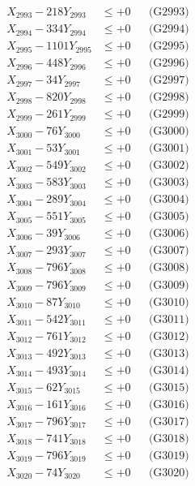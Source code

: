 \documentclass[a4paper,10pt]{article}
\begin{document}
{\begin{align}
X_{2993} - 218Y_{2993} &\leq +0 && \text{(G2993)} \\
X_{2994} - 334Y_{2994} &\leq +0 && \text{(G2994)} \\
X_{2995} - 1101Y_{2995} &\leq +0 && \text{(G2995)} \\
X_{2996} - 448Y_{2996} &\leq +0 && \text{(G2996)} \\
X_{2997} - 34Y_{2997} &\leq +0 && \text{(G2997)} \\
X_{2998} - 820Y_{2998} &\leq +0 && \text{(G2998)} \\
X_{2999} - 261Y_{2999} &\leq +0 && \text{(G2999)} \\
X_{3000} - 76Y_{3000} &\leq +0 && \text{(G3000)} \\
\allowbreak
X_{3001} - 53Y_{3001} &\leq +0 && \text{(G3001)} \\
X_{3002} - 549Y_{3002} &\leq +0 && \text{(G3002)} \\
X_{3003} - 583Y_{3003} &\leq +0 && \text{(G3003)} \\
X_{3004} - 289Y_{3004} &\leq +0 && \text{(G3004)} \\
X_{3005} - 551Y_{3005} &\leq +0 && \text{(G3005)} \\
X_{3006} - 39Y_{3006} &\leq +0 && \text{(G3006)} \\
X_{3007} - 293Y_{3007} &\leq +0 && \text{(G3007)} \\
X_{3008} - 796Y_{3008} &\leq +0 && \text{(G3008)} \\
X_{3009} - 796Y_{3009} &\leq +0 && \text{(G3009)} \\
X_{3010} - 87Y_{3010} &\leq +0 && \text{(G3010)} \\
\allowbreak
X_{3011} - 542Y_{3011} &\leq +0 && \text{(G3011)} \\
X_{3012} - 761Y_{3012} &\leq +0 && \text{(G3012)} \\
X_{3013} - 492Y_{3013} &\leq +0 && \text{(G3013)} \\
X_{3014} - 493Y_{3014} &\leq +0 && \text{(G3014)} \\
X_{3015} - 62Y_{3015} &\leq +0 && \text{(G3015)} \\
X_{3016} - 161Y_{3016} &\leq +0 && \text{(G3016)} \\
X_{3017} - 796Y_{3017} &\leq +0 && \text{(G3017)} \\
X_{3018} - 741Y_{3018} &\leq +0 && \text{(G3018)} \\
X_{3019} - 796Y_{3019} &\leq +0 && \text{(G3019)} \\
X_{3020} - 74Y_{3020} &\leq +0 && \text{(G3020)} \\

\end{align}}
\end{document}
